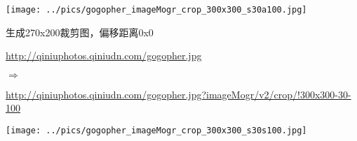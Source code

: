 \documentclass[11pt, oneside]{book}
\newcommand{\qpar}[1]{
\vspace{0.25em}
\noindent
#1\par
\vspace{0.25em}
}
\newcommand{\qurl}[1]{\url{#1}}
\begin{document}
\begin{CJK*}{UTF8}{song}
\begin{sample}
    \begin{center}
      \texttt{[image: ../pics/gogopher\_imageMogr\_crop\_300x300\_s30a100.jpg]}
    \end{center}
  \label{imageMogr-crop-300x300-s30a100}
\end{sample}

\begin{sample}
  \caption{生成270x200裁剪图，偏移距离0x0}
    \qpar{\qurl{http://qiniuphotos.qiniudn.com/gogopher.jpg}}
    \qpar{$\Rightarrow$}
    \qpar{\qurl{http://qiniuphotos.qiniudn.com/gogopher.jpg?imageMogr/v2/crop/!300x300-30-100}}

    \begin{center}
      \texttt{[image: ../pics/gogopher\_imageMogr\_crop\_300x300\_s30s100.jpg]}
    \end{center}
  \label{imageMogr-crop-300x300-s30s100}
\end{sample}

\end{CJK*}
\end{document}
